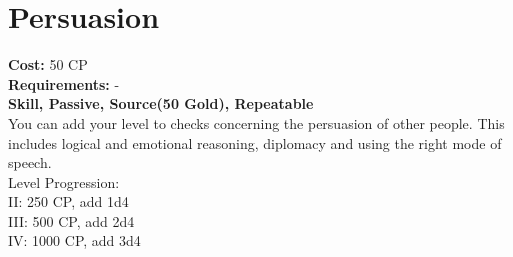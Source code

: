 \section{Persuasion}
\textbf{Cost:} 50 CP\\
\textbf{Requirements:} -\\
\textbf{Skill, Passive, Source(50 Gold), Repeatable}\\
You can add your level to checks concerning the persuasion of other people. This includes logical and emotional reasoning, diplomacy and using the right mode of speech.
\\
Level Progression:\\
II: 250 CP, add 1d4\\
III: 500 CP, add 2d4\\
IV: 1000 CP, add 3d4\\